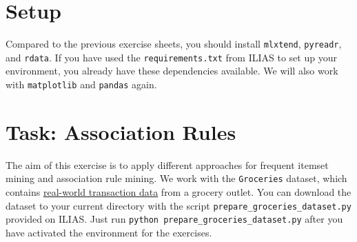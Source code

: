 \documentclass[12pt]{article}
\newcommand{\code}[1]{\textcolor{kitgreen}{\texttt{#1}}}
\begin{document}
\section*{Setup}

Compared to the previous exercise sheets, you should install \code{mlxtend}, \code{pyreadr}, and \code{rdata}.
If you have used the \code{requirements.txt} from ILIAS to set up your environment, you already have these dependencies available.
We will also work with \code{matplotlib} and \code{pandas} again.

\section*{Task: Association Rules}

The aim of this exercise is to apply different approaches for frequent itemset mining and association rule mining.
We work with the \code{Groceries} dataset, which contains \href{https://rdrr.io/cran/arules/man/Groceries.html}{real-world transaction data} from a grocery outlet.
You can download the dataset to your current directory with the script \code{prepare\_groceries\_dataset.py} provided on ILIAS.
Just run \code{python prepare\_groceries\_dataset.py} after you have activated the environment for the exercises.
\end{document}
